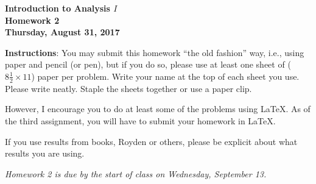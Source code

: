 \documentclass{article}%
\begin{document}
\begin{center}
\textbf{Introduction to Analysis $I$\\Homework 2\\Thursday, August 31, 2017}\bigskip
\end{center}

\noindent\textbf{Instructions}: You may submit this homework ``the old fashion'' way, i.e., using paper and pencil (or pen), but if you do so, please use at least one sheet of ($8\frac{1}{2}%
\times11$) paper per problem. Write your name at the top of each sheet you
use. Please write neatly. Staple the sheets together or use a paper clip.

However, I encourage you to do at least some of the problems using LaTeX.  As of the third assignment, you will have to submit your homework in LaTeX.

\noindent If you use results from books, Royden or others, please be explicit about what results you are using.



\begin{center}
\emph{Homework 2 is due by the start of class on Wednesday, September 13.}
\end{center} 
\medskip
\end{document}
